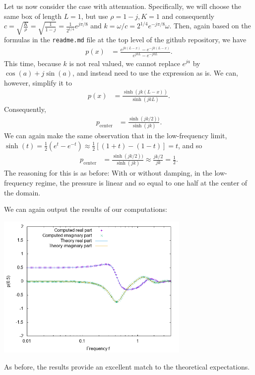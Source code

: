 \documentclass{article}
\begin{document}
Let us now consider the case with attenuation. Specifically, we will
choose the same box of length $L=1$, but use $\rho=1-j, K=1$ and
consequently $c=\sqrt{\frac{K}{\rho}}=\sqrt{\frac{1}{1-j}}=\frac{1}{2^{1/4}}e^{j\pi/8}$ 
and $k=\omega/c=2^{1/4}e^{-j\pi/8} \omega$. Then, again based
on the formulas in the \texttt{readme.md} file at the top level of the
github repository, we have
\begin{align*}
  p(x)
  &=
  \frac{e^{jk(L-x)} - e^{-jk(L-x)}}{e^{jkL} - e^{-jkL}}.
\end{align*}
This time, because $k$ is not real valued, we cannot replace $e^{ja}$
by $\cos(a)+j\sin(a)$, and instead need to use the expression as
is. We can, however, simplify it to
\begin{align*}
  p(x)
  &=
  \frac{\sinh(jk(L-x))}{\sinh(jkL)}.
\end{align*}
Consequently,
\begin{align*}
  p_\text{center}
  &=
  \frac{\sinh(jk/2))}{\sinh(jk)}.
\end{align*}
We can again make the same observation that in the low-frequency
limit, $\sinh(t)=\frac 12(e^t-e^{-t})\approx \frac 12[(1+t)-(1-t)]=t$,
and so
\begin{align*}
  p_\text{center}
  &=
  \frac{\sinh(jk/2))}{\sinh(jk)}
  \approx
  \frac{jk/2}{jk}
  = \frac 12.
\end{align*}
The reasoning for this is as before: With or without damping, in the
low-frequency regime, the pressure is linear and so equal to one half
at the center of the domain.

We can again output the results of our computations:
\begin{center}
\includegraphics[width=0.7\textwidth]{unit-cube/with-attenuation/pressure-at-center.png}
\end{center}
As before, the results provide an excellent match to the theoretical expectations.
\end{document}
